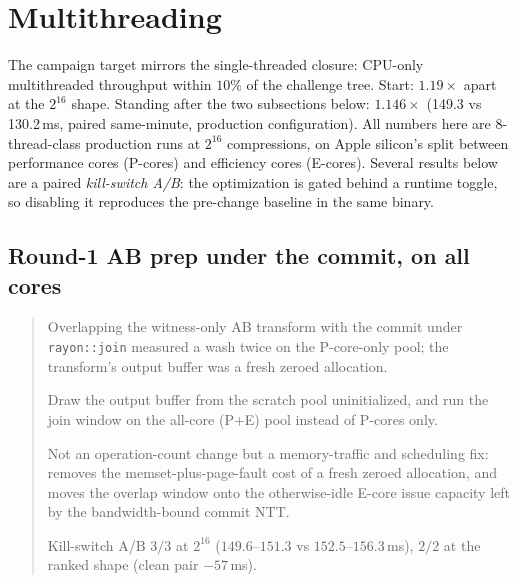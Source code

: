 \documentclass[11pt]{article}
\newcommand{\code}[1]{\texttt{#1}}
\newenvironment{optsummary}{%
  \begin{quote}\small
  \begin{description}
  \setlength{\itemsep}{1pt}\setlength{\parsep}{0pt}\setlength{\topsep}{2pt}
}{%
  \end{description}
  \end{quote}
}
\begin{document}
\section{Multithreading}
\label{sec:mt}

The campaign target mirrors the single-threaded closure: CPU-only
multithreaded throughput within $10\%$ of the challenge tree. Start:
$1.19\times$ apart at the $2^{16}$ shape. Standing after the two
subsections below: $1.146\times$ (149.3 vs 130.2\,ms, paired same-minute,
production configuration). All numbers here are 8-thread-class production
runs at $2^{16}$ compressions, on Apple silicon's split between
performance cores (P-cores) and efficiency cores (E-cores). Several
results below are a paired \emph{kill-switch A/B}: the optimization is
gated behind a runtime toggle, so disabling it reproduces the pre-change
baseline in the same binary.

\subsection{Round-1 AB prep under the commit, on all cores}
\label{sec:abhoist}

\begin{optsummary}
\item[Baseline:] Overlapping the witness-only AB transform with the commit under \code{rayon::join} measured a wash twice on the P-core-only pool; the transform's output buffer was a fresh zeroed allocation.
\item[Improvement:] Draw the output buffer from the scratch pool uninitialized, and run the join window on the all-core (P+E) pool instead of P-cores only.
\item[Mechanism:] Not an operation-count change but a memory-traffic and scheduling fix: removes the memset-plus-page-fault cost of a fresh zeroed allocation, and moves the overlap window onto the otherwise-idle E-core issue capacity left by the bandwidth-bound commit NTT.
\item[Result:] Kill-switch A/B $3/3$ at $2^{16}$ ($149.6$--$151.3$ vs $152.5$--$156.3\,$ms), $2/2$ at the ranked shape (clean pair $-57\,$ms).
\end{optsummary}
\end{document}
